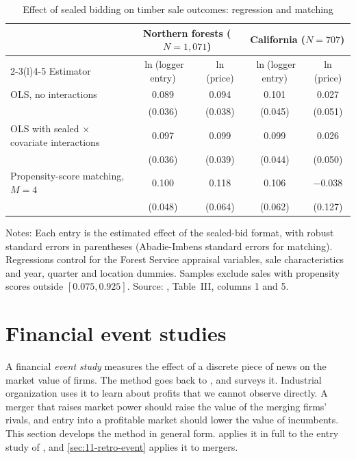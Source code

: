 \begin{table}[htbp]
\centering
\caption{Effect of sealed bidding on timber sale outcomes: regression and matching}
\label{tab:A-als}
\footnotesize
\begin{tabular}{@{}lcccc@{}}
\toprule
& \multicolumn{2}{c}{Northern forests ($N=1{,}071$)} & \multicolumn{2}{c}{California ($N=707$)}\\
\cmidrule(lr){2-3}\cmidrule(l){4-5}
Estimator & $\ln$(logger entry) & $\ln$(price) & $\ln$(logger entry) & $\ln$(price)\\
\midrule
OLS, no interactions & 0.089 & 0.094 & 0.101 & 0.027\\
 & (0.036) & (0.038) & (0.045) & (0.051)\\
OLS with sealed $\times$ covariate interactions & 0.097 & 0.099 & 0.099 & 0.026\\
 & (0.036) & (0.039) & (0.044) & (0.050)\\
Propensity-score matching, $M=4$ & 0.100 & 0.118 & 0.106 & $-0.038$\\
 & (0.048) & (0.064) & (0.062) & (0.127)\\
\bottomrule
\end{tabular}

\smallskip
\parbox{0.92\linewidth}{\footnotesize Notes: Each entry is the estimated effect of the sealed-bid format, with robust
standard errors in parentheses (Abadie-Imbens standard errors for matching). Regressions control for the Forest
Service appraisal variables, sale characteristics and year, quarter and location dummies. Samples exclude sales with
propensity scores outside $[0.075,0.925]$. Source: \citet{AtheyLevinSeira2011}, Table~III, columns 1 and 5.}
\end{table}

\section{Financial event studies}\label{sec:A-eventstudy}

A financial \emph{event study} measures the effect of a discrete piece of news on the market value of firms. The
method goes back to \citet{FamaEtAl1969}, and \citet{MacKinlay1997} surveys it. Industrial organization uses it to
learn about profits that we cannot observe directly. A merger that raises market power should raise the value of the
merging firms' rivals, and entry into a profitable market should lower the value of incumbents. This section
develops the method in general form.  applies it in full to the entry study of
\citet{WhinstonCollins1992}, and \cref{sec:11-retro-event} applies it to mergers.

